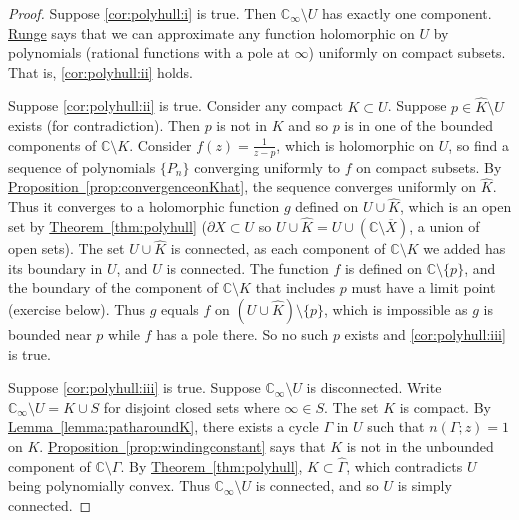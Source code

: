 \documentclass[12pt,openany]{book}
\newcommand{\widebar}[1]{\overline{#1}}
\newcommand{\C}{{\mathbb{C}}}
\theoremstyle{plain}
\theoremstyle{remark}
\theoremstyle{definition}
\theoremstyle{exercise}
\theoremstyle{example}
\newcommand{\thmref}[1]{\hyperref[#1]{Theorem~\ref*{#1}}}
\newcommand{\propref}[1]{\hyperref[#1]{Proposition~\ref*{#1}}}
\newcommand{\lemmaref}[1]{\hyperref[#1]{Lemma~\ref*{#1}}}
\begin{document}
\begin{proof}
Suppose \ref{cor:polyhull:i} is true.
Then $\C_\infty \setminus U$ has exactly one component.
\hyperref[cor:rungeseq]{Runge} says that we can approximate any function
holomorphic on $U$ by polynomials
(rational functions with a pole at $\infty$) uniformly on compact subsets.
That is, \ref{cor:polyhull:ii} holds.

Suppose \ref{cor:polyhull:ii} is true.
Consider any compact $K \subset U$.  Suppose $p \in \widehat{K} \setminus U$ exists
(for contradiction).
Then $p$ is not in $K$ and so $p$ is in one of the bounded components of $\C \setminus K$.
Consider $f(z) = \frac{1}{z-p}$, which is holomorphic on $U$, so find
a sequence of polynomials $\{ P_n \}$ converging uniformly to $f$ on compact
subsets.
By \propref{prop:convergenceonKhat},
the sequence converges uniformly on $\widehat{K}$.
Thus it converges to a holomorphic function
$g$ defined on $U \cup \widehat{K}$,
which is an open set by \thmref{thm:polyhull}
($\partial X \subset U$ so $U \cup \widehat{K} = U \cup (\C \setminus
\widebar{X})$, a union of open sets).
The set $U \cup \widehat{K}$ is connected, as each component
of $\C \setminus K$ we added has its boundary in $U$, and $U$ is connected.
The function $f$ is defined on $\C \setminus \{ p \}$,
and the boundary of the component of $\C \setminus K$ that includes $p$ must
have a limit point (exercise below).
Thus $g$ equals $f$ on $(U \cup \widehat{K}) \setminus \{ p \}$, which is
impossible as $g$ is bounded near $p$ while $f$ has a pole there.  So no
such $p$ exists and \ref{cor:polyhull:iii} is true.

Suppose \ref{cor:polyhull:iii} is true.  Suppose $\C_\infty \setminus U$
is disconnected.  Write $\C_\infty \setminus U = K \cup S$
for disjoint closed sets where $\infty \in S$.
The set $K$ is compact.
By \lemmaref{lemma:patharoundK}, there exists a cycle $\Gamma$ 
in $U$ such that $n(\Gamma;z) = 1$ on $K$.
\propref{prop:windingconstant} says that
$K$ is not in the unbounded component of $\C \setminus \Gamma$.
By \thmref{thm:polyhull},
$K \subset \widehat{\Gamma}$,
which contradicts $U$ being polynomially convex.  Thus
$\C_\infty \setminus U$ is connected, and so $U$ is simply connected.
\end{proof}
\end{document}
